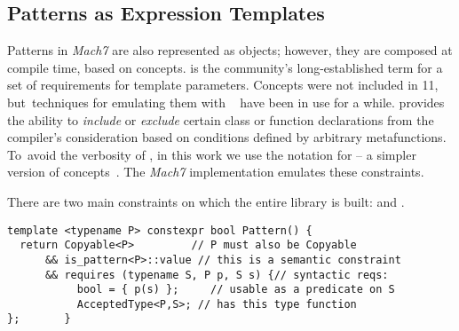 
\subsection{Patterns as Expression Templates}
\label{sec:pat}

Patterns in \emph{Mach7} are also represented as objects; however, they are 
composed at compile time, based on \Cpp{} concepts. 
 is the \Cpp{} community's long-established term for a set of 
requirements for template parameters. Concepts were not included in \Cpp{}11, 
but~techniques for emulating them with 
~\cite{jarvi:03:cuj_arbitrary_overloading} have been in use for 
a while.  provides the ability to \emph{include} or 
\emph{exclude} certain class or function declarations from the compiler's 
consideration based on conditions defined by arbitrary metafunctions.
To~avoid the verbosity of , in this work we use the notation 
for  -- a simpler version of concepts~\cite{N3580}.
The \emph{Mach7} implementation emulates these constraints.

There are two main constraints on which the entire library is built: 
 and .

\begin{lstlisting}[keepspaces]
template <typename P> constexpr bool Pattern() {
  return Copyable<P>         // P must also be Copyable
      && is_pattern<P>::value // this is a semantic constraint
      && requires (typename S, P p, S s) {// syntactic reqs:
           bool = { p(s) };     // usable as a predicate on S
           AcceptedType<P,S>; // has this type function
};       }
\end{lstlisting}

